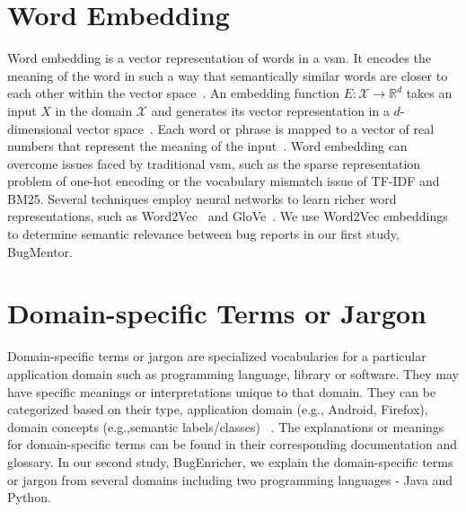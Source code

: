 \section{Word Embedding} \label{background:WordEmbedding}

Word embedding is a vector representation of words in a \acrfull{vsm}. It encodes the meaning of the word in such a way that semantically similar words are closer to each other within the vector space~\cite{moser2008comparative}. An embedding function $E: \mathcal{X} \rightarrow \mathbb{R}^d$ takes an input $X$ in the domain $\mathcal{X}$ and generates its vector representation in a $d$-dimensional vector space~\cite{cambronero2019deep}. Each word or phrase is mapped to a vector of real numbers that represent the meaning of the input~\cite{mahbub2022explaining}. 
Word embedding can overcome issues faced by traditional \acrshort{vsm}, such as the sparse representation problem of one-hot encoding or the vocabulary mismatch issue of \acrshort{TF-IDF} and BM25. Several techniques employ neural networks to learn richer word representations, such as Word2Vec~\cite{mikolov2013distributed} and GloVe~\cite{pennington2014glove}. We use Word2Vec embeddings to determine semantic relevance between bug reports in our first study, BugMentor.

\section{Domain-specific Terms or Jargon}\label{domaintermsdef}
Domain-specific terms or jargon are specialized vocabularies for a particular application domain such as programming language, library or software. They may have specific meanings or interpretations unique to that domain. They can be categorized based on their type, application domain (e.g., Android, Firefox), domain concepts (e.g.,semantic labels/classes) ~\cite{kim2011classifying, fowler2010domain}. The explanations or meanings for domain-specific terms can be found in their corresponding documentation and glossary. In our second study, BugEnricher, we explain the domain-specific terms or jargon from several domains including two programming languages - Java and Python.

